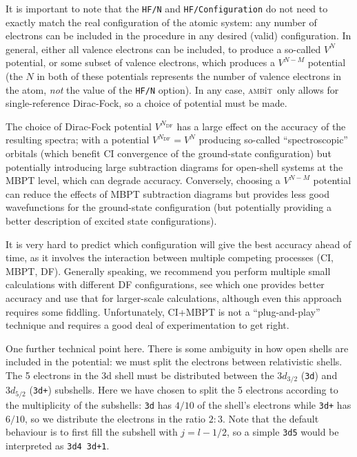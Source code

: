 \documentclass{report}
\newcommand{\ambit}{\textsc{amb}{\footnotesize i}\textsc{t}}
\begin{document}
It is important to note that the \texttt{HF/N} and \texttt{HF/Configuration} do not need to exactly
match the real configuration of the atomic system: any number of electrons can be included in the 
procedure in any desired (valid) configuration. In general, either all valence electrons can be
included, to produce a so-called $V^N$ potential, or some subset of valence electrons, which produces a
$V^{N-M}$ potential (the $N$ in both of these potentials represents the number of valence electrons in 
the atom, \emph{not} the value of the \texttt{HF/N} option). In any case, \ambit\ only allows for single-reference Dirac-Fock, so a choice of potential must be made.

The choice of Dirac-Fock potential $V^{N_{\mathrm{DF}}}$ has a large effect on the accuracy of the 
resulting spectra; with a potential $V^{N_{\mathrm{DF}}} = V^{N}$ producing so-called ``spectroscopic'' 
orbitals (which benefit CI convergence of the ground-state configuration) but potentially introducing 
large subtraction diagrams for open-shell systems at the MBPT level, which can degrade accuracy. 
Conversely, choosing a $V^{N-M}$ potential can reduce the effects of MBPT subtraction diagrams but
provides less good wavefunctions for the ground-state configuration (but potentially providing a better
description of excited state configurations). 

It is very hard to predict which configuration will give the best accuracy ahead of time, as it involves
the interaction between multiple competing processes (CI, MBPT, DF). Generally speaking, we recommend 
you perform multiple small calculations with different DF configurations, see which one provides better 
accuracy and use that for larger-scale calculations, although even this approach requires some fiddling.
Unfortunately, CI+MBPT is not a ``plug-and-play'' technique and requires a good deal of experimentation
to get right.

One further technical point here. There is some ambiguity in how open shells are included in the potential: we must split the electrons between relativistic shells. The 5 electrons in the 3d shell must be distributed between the $3d_{3/2}$ (\texttt{3d}) and $3d_{5/2}$ (\texttt{3d+}) subshells. Here we have chosen to split the 5 electrons according to the multiplicity of the subshells: \texttt{3d} has $4/10$ of the shell's electrons while \texttt{3d+} has $6/10$, so we distribute the electrons in the ratio $2:3$. Note that the default behaviour is to first fill the subshell with $j = l-1/2$, so a simple \texttt{3d5} would be interpreted as \texttt{3d4 3d+1}.
\end{document}
